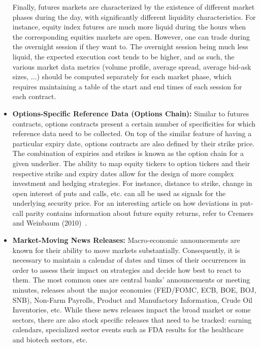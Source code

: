 \begin{itemize}
Finally, futures markets are characterized by the existence of different market phases during the day, with significantly different liquidity characteristics. For instance, equity index futures are much more liquid during the hours when the corresponding equities markets are open. However, one can trade during the overnight session if they want to. The overnight session being much less liquid, the expected execution cost tends to be higher, and as such, the various market data metrics (volume profile, average spread, average bid-ask sizes, ...) should be computed separately for each market phase, which requires maintaining a table of the start and end times of each session for each contract. 



\pagebreak



\item \textbf{Options-Specific Reference Data (Options Chain):} Similar to futures contracts, options contracts present a certain number of specificities for which reference data need to be collected. On top of the similar feature of having a particular expiry date, options contracts are also defined by their strike price. The combination of expiries and strikes is known as the option chain for a given underlier. The ability to map equity tickers to option tickers and their respective strike and expiry dates allow for the design of more complex investment and hedging strategies. For instance, distance to strike, change in open interest of puts and calls, etc. can all be used as signals for the underlying security price. For an interesting article on how deviations in put-call parity contains information about future equity returns, refer to Cremers and Weinbaum (2010)~\cite{weinbaum2010}.


\item \textbf{Market-Moving News Releases:} Macro-economic announcements are known for their ability to move markets substantially. Consequently, it is necessary to maintain a calendar of dates and times of their occurrences in order to assess their impact on strategies and decide how best to react to them. The most common ones are central banks' announcements or meeting minutes, releases about the major economies (FED/FOMC, ECB, BOE, BOJ, SNB), Non-Farm Payrolls, Product and Manufactory Information, Crude Oil Inventories, etc. While these news releases impact the broad market or some sectors, there are also stock specific releases that need to be tracked: earning calendars, specialized sector events such as FDA results for the healthcare and biotech sectors, etc.



\end{itemize}
